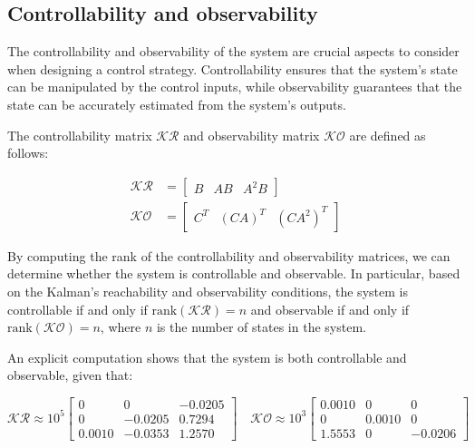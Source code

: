 \subsection{Controllability and observability}
\label{subsec:controllability_observability}

The controllability and observability of the system are crucial aspects to consider when designing a control strategy.
Controllability ensures that the system's state can be manipulated by the control inputs, while observability guarantees that the state can be accurately estimated from the system's outputs.

The controllability matrix $\mathcal{KR}$ and observability matrix $\mathcal{KO}$ are defined as follows:

\begin{equation}
    \begin{aligned}
        \mathcal{KR} & =
        \begin{bmatrix}
            B & AB & A^2B
        \end{bmatrix}   \\
        \mathcal{KO} & =
        \begin{bmatrix}
            C^T & (CA)^T & (CA^2)^T
        \end{bmatrix}
    \end{aligned}
\end{equation}

By computing the rank of the controllability and observability matrices, we can determine whether the system is controllable and observable.
In particular, based on the Kalman's reachability and observability conditions, the system is controllable if and only if $\text{rank}(\mathcal{KR}) = n$ and observable if and only if $\text{rank}(\mathcal{KO}) = n$, where $n$ is the number of states in the system.

An explicit computation shows that the system is both controllable and observable, given that:

\begin{equation}
    \mathcal{KR} \approx 10^{5}
    \begin{bmatrix}
        0      & 0       & -0.0205 \\
        0      & -0.0205 & 0.7294  \\
        0.0010 & -0.0353 & 1.2570
    \end{bmatrix}
    \quad
    \mathcal{KO} \approx 10^{3}
    \begin{bmatrix}
        0.0010 & 0      & 0       \\
        0      & 0.0010 & 0       \\
        1.5553 & 0      & -0.0206
    \end{bmatrix}
\end{equation}